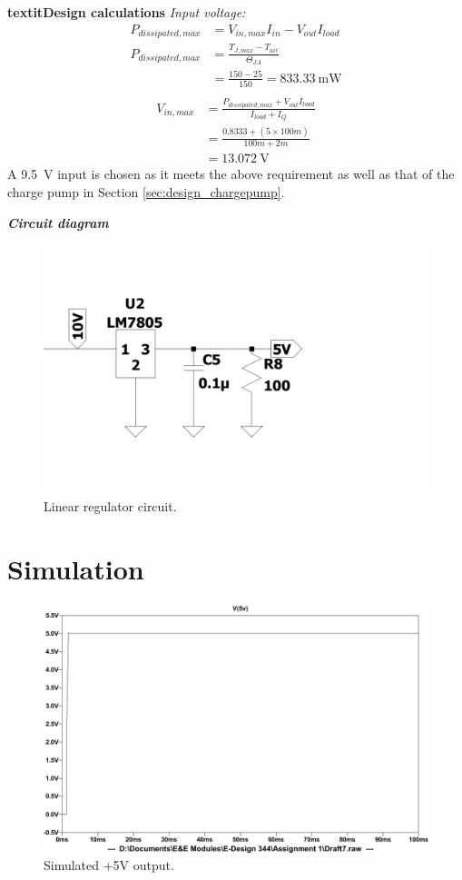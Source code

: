 \noindent\textbf{textit{Design calculations}}
\textit{Input voltage:}
\begin{equation*}
    \begin{split}
        P_{dissipated,max} &=  V_{in,max}I_{in} - V_{out}I_{load} \\
        P_{dissipated,max} &= \frac{T_{J,max} - T_{air}}{\Theta_{JA}} \\
        &=\frac{150-25}{150}=\SI{833.33}{\milli\watt} \\
    \end{split}
\end{equation*}
\begin{equation}
    \begin{split}
        V_{in,max} &= \frac{P_{dissipated,max} + V_{out}I_{load}}{I_{load}+I_Q} \\ 
        &=\frac{0.8333+(5 \times 100m)}{100m+2m} \\
        &=\SI{13.072}{\volt}
    \end{split}
    \label{eq:linear_input}
\end{equation}
A \SI{9.5}{\volt} input is chosen as it meets the above requirement as well as that of the charge pump in Section \ref{sec:design_chargepump}.

\noindent\textbf{\textit{Circuit diagram}} \label{subsec:design_linear_circuit}
\begin{figure}[h]
 \centering
  	\includegraphics[width=0.75\linewidth]{./Figures/linear_circuit.pdf}
  	\caption{Linear regulator circuit.}
  	\label{fig:linear_circuit}
 \end{figure}
 
 

\section{Simulation} \label{sec:simulation_linear}
\begin{figure} 
 \centering
  	\includegraphics[width=0.6\linewidth]{./Figures/linear_simulate.pdf}
  	\caption{Simulated +5V output.}
  	\label{fig:+5v_simulation}
 \end{figure}
 
